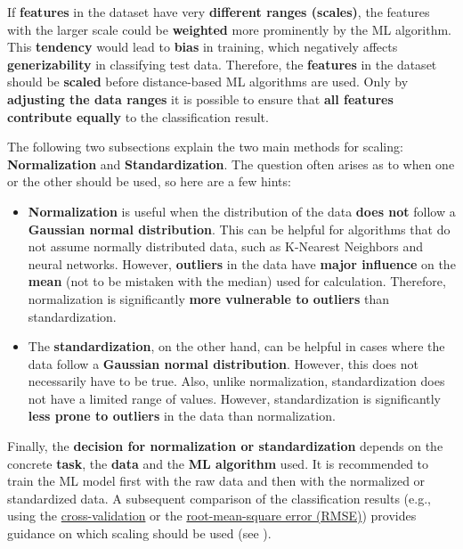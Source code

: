 \documentclass [oneside,10pt,a4paper,ngerman,BCOR10mm,headsepline,parindent,final]{scrartcl}
\providecommand{\tightlist}{%
      \setlength{\itemsep}{0pt}\setlength{\parskip}{0pt}}
\begin{document}
If \textbf{features} in the dataset have very \textbf{different ranges
(scales)}, the features with the larger scale could be \textbf{weighted}
more prominently by the ML algorithm. This \textbf{tendency} would lead
to \textbf{bias} in training, which negatively affects
\textbf{generizability} in classifying test data. Therefore, the
\textbf{features} in the dataset should be \textbf{scaled} before
distance-based ML algorithms are used. Only by \textbf{adjusting the
data ranges} it is possible to ensure that \textbf{all features
contribute equally} to the classification result.

The following two subsections explain the two main methods for scaling:
\textbf{Normalization} and \textbf{Standardization}. The question often
arises as to when one or the other should be used, so here are a few
hints:

\begin{itemize}
\tightlist
\item
  \textbf{Normalization} is useful when the distribution of the data
  \textbf{does not} follow a \textbf{Gaussian normal distribution}. This
  can be helpful for algorithms that do not assume normally distributed
  data, such as K-Nearest Neighbors and neural networks. However,
  \textbf{outliers} in the data have \textbf{major influence} on the
  \textbf{mean} (not to be mistaken with the median) used for
  calculation. Therefore, normalization is significantly \textbf{more
  vulnerable to outliers} than standardization.
\item
  The \textbf{standardization}, on the other hand, can be helpful in
  cases where the data follow a \textbf{Gaussian normal distribution}.
  However, this does not necessarily have to be true. Also, unlike
  normalization, standardization does not have a limited range of
  values. However, standardization is significantly \textbf{less prone
  to outliers} in the data than normalization.
\end{itemize}

Finally, the \textbf{decision for normalization or standardization}
depends on the concrete \textbf{task}, the \textbf{data} and the
\textbf{ML algorithm} used. It is recommended to train the ML model
first with the raw data and then with the normalized or standardized
data. A subsequent comparison of the classification results (e.g., using
the
\href{https://en.wikipedia.org/wiki/Cross-validation_(statistics)}{cross-validation}
or the
\href{https://en.wikipedia.org/wiki/Root-mean-square_deviation}{root-mean-square
error (RMSE)}) provides guidance on which scaling should be used (see
\cite{feature_scaling_2020}).
\end{document}
